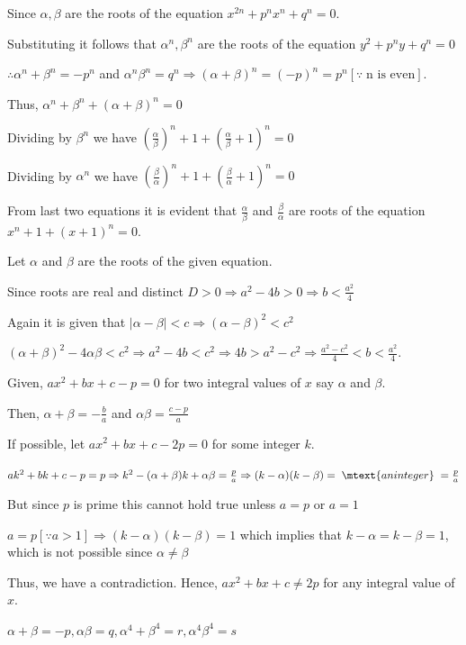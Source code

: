   Since $\alpha, \beta$ are the roots of the equation $x^{2n} + p^nx^n + q^n = 0$.

  Substituting it follows that $\alpha^n, \beta^n$ are the roots of the equation $y^2 + p^ny + q^n = 0$

  $\therefore \alpha^n + \beta^n = -p^n$ and $\alpha^n\beta^n = q^n\Rightarrow (\alpha + \beta)^n = (-p)^n
  = p^n [\because\;\text{n is even}]$.

  Thus, $\alpha^n + \beta^n + (\alpha + \beta)^n = 0$

  Dividing by $\beta^n$ we have $\left(\frac{\alpha}{\beta}\right)^n + 1 + \left(\frac{\alpha}{\beta} + 1\right)^n = 0$

  Dividing by $\alpha^n$ we have
  $\left(\frac{\beta}{\alpha}\right)^n + 1 + \left(\frac{\beta}{\alpha} + 1\right)^n = 0$

  From last two equations it is evident that $\frac{\alpha}{\beta}$ and $\frac{\beta}{\alpha}$ are roots
  of the equation $x^n + 1 + (x + 1)^n = 0$.
\item Let $\alpha$ and $\beta$ are the roots of the given equation.

  Since roots are real and distinct $D > 0 \Rightarrow a^2 - 4b > 0 \Rightarrow b < \frac{a^2}{4}$

  Again it is given that $|\alpha - \beta| < c \Rightarrow (\alpha - \beta)^2 < c^2$

  $(\alpha + \beta)^2 - 4\alpha\beta < c^2 \Rightarrow a^2 - 4b < c^2 \Rightarrow 4b > a^2 - c^2\Rightarrow
  \frac{a^2 - c^2}{4} < b < \frac{a^2}{4}$.
\item Given, $ax^2 + bx + c - p = 0$ for two integral values of $x$ say $\alpha$ and $\beta$.

  Then, $\alpha + \beta = -\frac{b}{a}$ and $\alpha\beta = \frac{c - p}{a}$

  If possible, let $ax^2 + bx + c - 2p = 0$ for some integer $k$.

  $ak^2 + bk + c - p = p \Rightarrow k^2 - (\alpha + \beta)k + \alpha\beta = \frac{p}{a}\Rightarrow (k -
  \alpha)(k - \beta) =\;\mtext{an integer}\;= \frac{p}{a}$

  But since $p$ is prime this cannot hold true unless $a = p$ or $a = 1$

  $a = p [\because a > 1]\Rightarrow (k - \alpha)(k - \beta) = 1$ which implies that $k - \alpha = k - \beta
  = 1$,
  which is not possible since $\alpha \ne \beta$

  Thus, we have a contradiction. Hence, $ax^2 + bx + c \ne 2p$ for any integral value of $x$.
\item $\alpha + \beta = -p, \alpha\beta = q, \alpha^4 + \beta^4 = r, \alpha^4\beta^4 = s$

